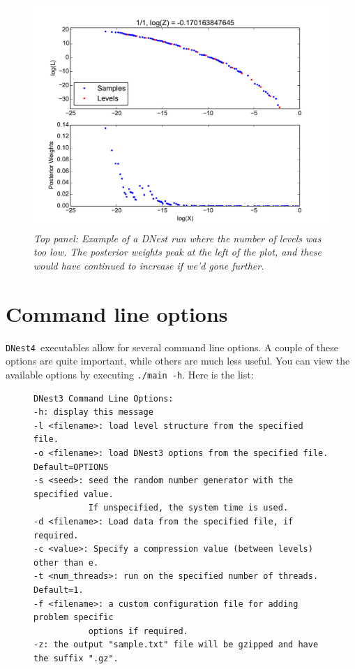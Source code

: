 \documentclass[a4paper, 11pt]{article}
\newcommand{\dnest}{{\tt DNest4}}
\begin{document}
\begin{figure}
\begin{center}
\includegraphics[scale=0.5]{not_enough_levels.pdf}
\caption{\it Top panel: Example of a DNest run where the number of levels
was too low. The posterior weights peak at the left of the plot, and these
would have continued to increase if we'd gone further.
\label{fig:not_enough_levels}}
\end{center}
\end{figure}

\section{Command line options}\label{sec:commandline}
\dnest~executables allow for several command line options. A couple of these
options are quite important, while others are much less useful.
You can view the available options by executing
{\tt ./main -h}. Here is the list:\\

\begin{figure}
\begin{framed}
\begin{verbatim}
DNest3 Command Line Options:
-h: display this message
-l <filename>: load level structure from the specified file.
-o <filename>: load DNest3 options from the specified file. Default=OPTIONS
-s <seed>: seed the random number generator with the specified value.
           If unspecified, the system time is used.
-d <filename>: Load data from the specified file, if required.
-c <value>: Specify a compression value (between levels) other than e.
-t <num_threads>: run on the specified number of threads. Default=1.
-f <filename>: a custom configuration file for adding problem specific
           options if required.
-z: the output "sample.txt" file will be gzipped and have the suffix ".gz".
\end{verbatim}
\end{framed}
\end{figure}
\end{document}
